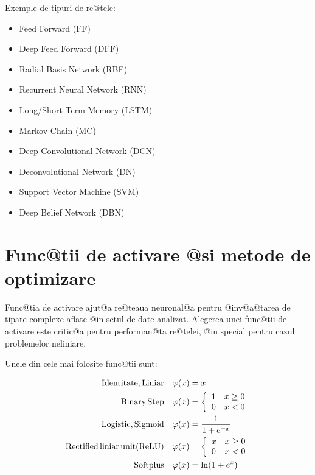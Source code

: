 Exemple de tipuri de re@tele:

\begin{itemize}
	\item Feed Forward (FF)
	\item Deep Feed Forward (DFF)
	\item Radial Basis Network (RBF)
	\item Recurrent Neural Network (RNN)
	\item Long/Short Term Memory (LSTM)
	\item Markov Chain (MC)
	\item Deep Convolutional Network (DCN)
	\item Deconvolutional Network (DN)
	\item Support Vector Machine (SVM)
	\item Deep Belief Network (DBN)
\end{itemize}



\section{Func@tii de activare @si metode de optimizare}
Func@tia de activare ajut@a re@teaua neuronal@a pentru @inv@a@tarea de tipare complexe aflate @in setul de date analizat. Alegerea unei func@tii de activare este critic@a pentru performan@ta re@telei, @in special pentru cazul problemelor neliniare.

Unele din cele mai folosite func@tii sunt:

\begin{align}
	{\rm Identitate, Liniar} \quad \varphi (x) &= x \label{eq:liniar} \\
	{\rm Binary \, Step} \quad \varphi (x) &= \left\lbrace
		\begin{array}{lc}
			1 & x \geq 0 \\
			0 & x < 0
		\end{array}
	\right. \\
	{\rm Logistic, Sigmoid} \quad \varphi (x) &= \displaystyle\frac{1}{1 + e^{-x}} \\
	{\rm Rectified\, liniar\, unit (ReLU)} \quad \varphi (x) &= \left\lbrace
		\begin{array}{lc}
			x & x \geq 0 \\
			0 & x < 0
		\end{array}
	\right. \label{eq:relu} \\
	{\rm Softplus} \quad \varphi (x) &= \ln ( 1 + e^x) 
\end{align}

